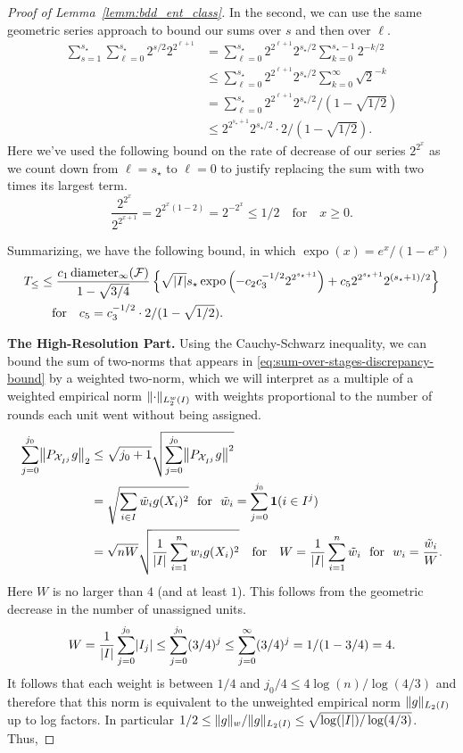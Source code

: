 \documentclass{article}
\DeclarePairedDelimiter\norm{\lVert}{\rVert}
\DeclarePairedDelimiter\abs{\lvert}{\rvert}
\DeclareMathOperator{\expo}{expo}
\theoremstyle{definition}
\newcommand{\calF}{\ensuremath{\mathcal{F}}}
\newcommand{\calX}{\ensuremath{\mathcal{X}}}
\DeclareMathOperator{\diameter}{diameter}
\newcommand{\diam}{\diameter}
\newcommand{\qfor}{\quad \text{for} \quad}
\newcommand{\<}{\langle}
\renewcommand{\>}{\rangle}
\begin{document}
\begin{refsection}
\begin{proof}[Proof of Lemma~\ref{lemm:bdd_ent_class}]
In the second, we can use the same geometric series approach to bound our sums over $s$ and then over $\ell$.
$$
\begin{aligned}
\sum_{s=1}^{s_\star} \sum_{\ell=0}^{s_\star} 2^{s/2} 2^{2^{\ell+1}}
&= \sum_{\ell=0}^{s_{\star}} 2^{2^{\ell+1}} 2^{s_\star/2}\sum_{k=0}^{s_\star-1} 2^{-k/2} \\
&\le \sum_{\ell=0}^{s_{\star}} 2^{2^{\ell+1}} 2^{s_\star/2}\sum_{k=0}^{\infty} \sqrt{2}^{-k} \\
&= \sum_{\ell=0}^{s_{\star}} 2^{2^{\ell+1}} 2^{s_\star/2}/\left(1-\sqrt{1/2}\right) \\
&\le 2^{2^{s_\star+1}} 2^{s_\star/2} \cdot 2/\left(1-\sqrt{1/2}\right).
\end{aligned}
$$
Here we've used the following bound on the rate of decrease of our series $2^{2^x}$ as we count down from $\ell=s_\star$ to $\ell=0$
to justify replacing the sum with two times its largest term.
$$
\frac{2^{2^x}}{2^{2^{x+1}}} = 2^{2^{x}(1-2)}=2^{-2^x} \le 1/2 \qfor x \ge 0.
$$

Summarizing, we have the following bound, in which $\expo(x)=e^x /(1-e^x)$
$$
\begin{aligned}
T_{\le}
&\le \frac{c_1 \diam_{\infty}(\calF) }{1-\sqrt{3/4}}
\left\{ \sqrt{\abs{I}} s_\star \expo\left(-c_2 c_3^{-1/2} 2^{2^{s_\star+1}}\right) + c_5 2^{2^{s_\star+1}} 2^{(s_\star+1)/2} \right\} \\
&\qfor c_5 = c_3^{-1/2} \cdot 2/(1-\sqrt{1/2}).
\end{aligned}
$$

\noindent\textbf{The High-Resolution Part.}
Using the Cauchy-Schwarz inequality, we can bound the sum of two-norms that appears in
\eqref{eq:sum-over-stages-discrepancy-bound}
by a weighted two-norm, which we will interpret as a multiple of a weighted empirical norm $\norm{\cdot}_{L_2^w(I)}$ with weights proportional to the number of rounds each unit went without being assigned.
$$
\begin{aligned}
\sum_{j=0}^{j_0} \norm*{P_{\calX_{I^j}} g }_2
&\le\sqrt{j_0+1}\sqrt{ \sum_{j=0}^{j_0} \norm*{P_{\calX_{I^j}} g }^2 } \\
&=\sqrt{\sum_{i \in I} \tilde w_i g(X_i)^2} \ \ \text{for} \ \  \tilde w_i =  \sum_{j=0}^{j_0} \mathbf{1}(i \in I^j) \\
&=\sqrt{nW}\sqrt{\frac{1}{\abs{I}}\sum_{i=1}^n w_i g(X_i)^2 } \ \ \text{ for } \ \
W = \frac{1}{\abs{I}}\sum_{i=1}^n \tilde w_i \ \ \text{for} \ \  w_i = \frac{\tilde w_i}{W}.
\end{aligned}
$$
Here $W$ is no larger than $4$ (and at least $1$). This follows from the geometric decrease in the number of unassigned units.
$$
W=\frac{1}{\abs{I}}\sum_{j=0}^{j_0} \abs{I_j} \le \sum_{j=0}^{j_0} (3/4)^j \le \sum_{j=0}^{\infty} (3/4)^j =  1/(1-3/4)=4.
$$
It follows that each weight is between $1/4$ and $j_0/4 \le 4\log(n)/\log(4/3)$ and therefore that this norm is equivalent to the unweighted empirical norm $\norm{g}_{L_2(I)}$ up to log factors. In particular $1/2 \le \norm{g}_w/\norm{g}_{L_2(I)} \le \sqrt{\log(\abs{I})/\log(4/3)}$. Thus,


\end{proof}
\end{refsection}
\end{document}
